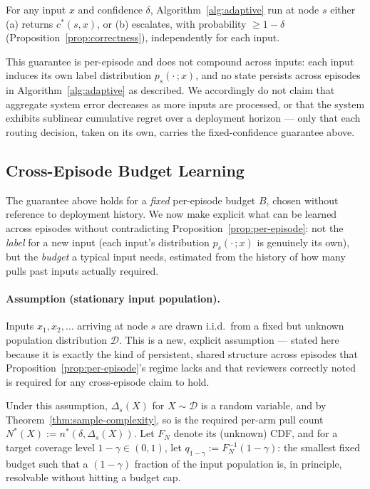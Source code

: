 \begin{proposition}
\label{prop:per-episode}
For any input $x$ and confidence $\delta$, Algorithm~\ref{alg:adaptive} run at node $s$ either (a) returns $c^*(s,x)$, or (b) escalates, with probability $\geq 1-\delta$ (Proposition~\ref{prop:correctness}), independently for each input.
\end{proposition}

This guarantee is per-episode and does not compound across inputs: each input induces its own label distribution $p_s(\cdot\,;x)$, and no state persists across episodes in Algorithm~\ref{alg:adaptive} as described. We accordingly do not claim that aggregate system error decreases as more inputs are processed, or that the system exhibits sublinear cumulative regret over a deployment horizon — only that each routing decision, taken on its own, carries the fixed-confidence guarantee above.

\subsection{Cross-Episode Budget Learning}
\label{sec:cross-episode}

The guarantee above holds for a \emph{fixed} per-episode budget $B$, chosen without reference to deployment history. We now make explicit what can be learned across episodes without contradicting Proposition~\ref{prop:per-episode}: not the \emph{label} for a new input (each input's distribution $p_s(\cdot\,;x)$ is genuinely its own), but the \emph{budget} a typical input needs, estimated from the history of how many pulls past inputs actually required.

\paragraph{Assumption (stationary input population).} Inputs $x_1, x_2, \dots$ arriving at node $s$ are drawn i.i.d.\ from a fixed but unknown population distribution $\mathcal{D}$. This is a new, explicit assumption — stated here because it is exactly the kind of persistent, shared structure across episodes that Proposition~\ref{prop:per-episode}'s regime lacks and that reviewers correctly noted is required for any cross-episode claim to hold.

Under this assumption, $\Delta_s(X)$ for $X \sim \mathcal{D}$ is a random variable, and by Theorem~\ref{thm:sample-complexity}, so is the required per-arm pull count $N^*(X) := n^*(\delta, \Delta_s(X))$. Let $F_N$ denote its (unknown) CDF, and for a target coverage level $1-\gamma \in (0,1)$, let $q_{1-\gamma} := F_N^{-1}(1-\gamma)$: the smallest fixed budget such that a $(1-\gamma)$ fraction of the input population is, in principle, resolvable without hitting a budget cap.

